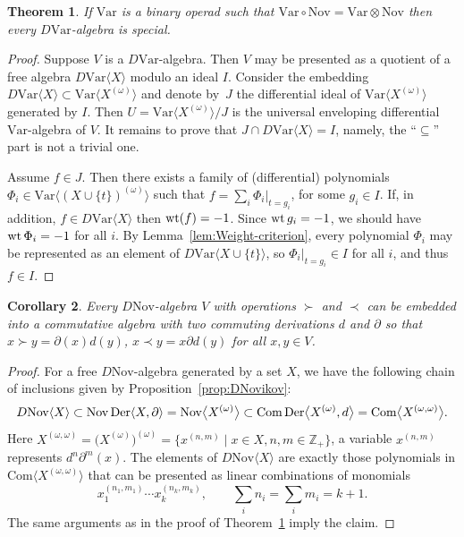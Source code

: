 \documentclass[pdftex]{sigma}
\numberwithin{equation}{section}
\newtheorem{Theorem}{Theorem}[section]
\newtheorem{Corollary}[Theorem]{Corollary}
\def\Var{\mathrm{Var}}
\def\Nov{\mathrm{Nov}}
\def\Com{\mathrm{Com}}
\def\wt {\mathop {\fam 0 wt}\nolimits}
\def\Der {\mathop {\fam 0 Der}\nolimits}
\begin{document}
\begin{Theorem}\label{thm:Weight-Embedding}
If
$\Var $ is a binary operad such that
$\Var\circ \Nov = \Var\otimes \Nov $
then every $D\Var $-algebra is special.
\end{Theorem}

\begin{proof}
Suppose $V$ is a $D\Var $-algebra.
Then $V$ may be presented as a quotient
of a free algebra $D\Var\langle X\rangle $ modulo an ideal $I$.
Consider the embedding $D\Var\langle X\rangle \subset \Var\bigl\langle X^{(\omega )}\bigr\rangle $
and denote by~$J$ the differential ideal of $\Var\bigl\langle X^{(\omega )}\bigr\rangle $
generated by $I$.
Then $U = \Var \bigl\langle X^{(\omega )}\bigr\rangle /J$ is the universal enveloping
differential $\Var $-algebra of $V$. It remains to prove that $J\cap D\Var\langle X\rangle = I$,
namely, the ``$\subseteq $'' part is not a trivial one.

Assume $f\in J$. Then there exists a family of (differential) polynomials
$\Phi_i \in \Var\bigl\langle (X\cup\{t\})^{(\omega )} \bigr\rangle $
such that $f = \sum_i \Phi_i|_{t=g_i}$, for some $g_i\in I$.
If, in addition, $f\in D\Var\langle X\rangle $ then
$\wt (f)=-1$. Since $\wt g_i=-1$, we should have $\wt \Phi_i=-1$ for all $i$.
By Lemma~\ref{lem:Weight-criterion}, every polynomial $\Phi_i$ may be
represented as an element of $D\Var\langle X\cup\{t\}\rangle $,
so $\Phi_i|_{t=g_i} \in I$ for all $i$, and thus $f\in I$.
\end{proof}

\begin{Corollary}\label{cor:NovDer}
Every $D\Nov$-algebra $V$ with operations $\succ $ and $\prec$
can be embedded
into a commutative algebra with two commuting derivations $d$
and $\partial $
so that
$x\succ y = \partial(x)d(y)$, $x\prec y = x\partial d(y)$
for all $x,y\in V$.
\end{Corollary}

\begin{proof}
For a free $D\Nov $-algebra generated by a set $X$, we have the following
chain of inclusions given by Proposition~\ref{prop:DNovikov}:
\[
D\Nov\langle X\rangle \subset
\Nov\Der\langle X, \partial \rangle = \Nov \bigl\langle X^{(\omega )}\bigr\rangle
\subset \Com\Der\bigl\langle X^{(\omega )}, d \bigr\rangle = \Com \bigl\langle X^{(\omega , \omega )} \bigr\rangle .
\]
Here $X^{(\omega ,\omega )} = \bigl(X^{(\omega )}\bigr)^{(\omega )} = \bigl\{x^{(n,m)} \mid
x\in X, n,m\in \mathbb Z_+ \bigr\}$,
a variable $x^{(n,m)}$ represents $d^n\partial^m(x)$. The elements of $D\Nov \langle X\rangle $
are exactly those polynomials in $\Com \bigl\langle X^{(\omega , \omega )} \bigr\rangle$
that can be presented as linear combinations of monomials
\[
x_1^{(n_1,m_1)}\cdots x_k^{(n_k,m_k)},\qquad \sum_i n_i = \sum_i m_i = k+1.
\]
The same arguments as in the proof of Theorem~\ref{thm:Weight-Embedding} imply
the claim.
\end{proof}
\end{document}
